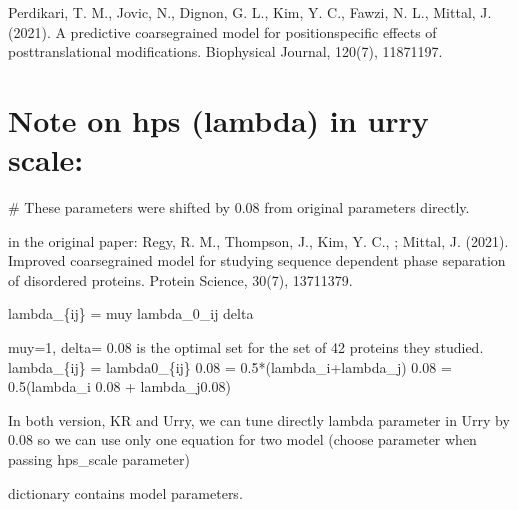 \documentclass[letterpaper,10pt,english]{sphinxmanual}
\begin{document}
\sphinxAtStartPar
Perdikari, T. M., Jovic, N., Dignon, G. L., Kim, Y. C., Fawzi, N. L.,  Mittal, J. (2021).
A predictive coarse\sphinxhyphen{}grained model for position\sphinxhyphen{}specific effects of post\sphinxhyphen{}translational modifications.
Biophysical Journal, 120(7), 1187\textendash{}1197.


\section{Note on hps (lambda) in urry scale:}
\label{\detokenize{modules/parameters:note-on-hps-lambda-in-urry-scale}}
\sphinxAtStartPar
\# These parameters were shifted by 0.08 from original parameters directly.

\sphinxAtStartPar
in the original paper:
Regy, R. M., Thompson, J., Kim, Y. C., ; Mittal, J. (2021).
Improved coarse\sphinxhyphen{}grained model for studying sequence dependent phase separation of disordered proteins.
Protein Science, 30(7), 1371\textendash{}1379. 
\begin{description}
\sphinxAtStartPar
lambda\_\{ij\} = muy lambda\_0\_ij \sphinxhyphen{} delta

\sphinxAtStartPar
muy=1, delta= 0.08 is the optimal set for the set of 42 proteins they studied.
lambda\_\{ij\} = lambda0\_\{ij\} \sphinxhyphen{} 0.08 = 0.5*(lambda\_i+lambda\_j) \sphinxhyphen{} 0.08 = 0.5(lambda\_i \sphinxhyphen{}0.08 + lambda\_j\sphinxhyphen{}0.08)

\end{description}

\sphinxAtStartPar
In both version, KR and Urry, we can tune directly lambda parameter in Urry by 0.08 so we can use only one equation for
two model (choose parameter when passing hps\_scale parameter)

\begin{fulllineitems}
\label{\detokenize{modules/parameters:hps.parameters.model_parameters.parameters}}
\pysigstartsignatures
{}
\pysigstopsignatures
\sphinxAtStartPar
dictionary contains model parameters.

\end{fulllineitems}
\end{document}
